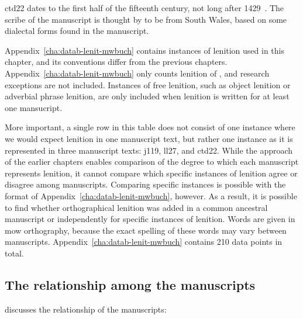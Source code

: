 \Acrfull{ctd22} dates to the first half of the fifteenth century, not long after 1429~\autocite{Eva_Welsh88}. The scribe of the manuscript is thought by \textcite[107]{Pow_description81} to be from South Wales, based on some dialectal forms found in the manuscript.

Appendix~\ref{cha:datab-lenit-mwbuch} contains instances of lenition used in this chapter, and its conventions differ from the previous chapters. Appendix~\ref{cha:datab-lenit-mwbuch} only counts lenition of , and research exceptions are not included. Instances of free lenition, such as object lenition or adverbial phrase lenition, are only included when lenition is written for at least one mansucript.

More important, a single row in this table does not consist of one instance where we would expect lenition in one manuscript text, but rather one instance as it is represented in three manuscript texts: \gls{j119}, \gls{ll27}, and \gls{ctd22}. While the approach of the earlier chapters enables  comparison of  the degree to which each manuscript represents lenition, it cannot compare which specific instances of lenition agree or disagree among manuscripts. Comparing specific instances is possible with the format of Appendix~\ref{cha:datab-lenit-mwbuch}, however.
As a result, it is possible to find  whether orthographical lenition was added in a common ancestral manuscript or independently for  specific instances of lenition. Words are given in \gls{mow} orthography, because the exact spelling of these words may vary between manuscripts.  Appendix~\ref{cha:datab-lenit-mwbuch} contains 210 data points in total.


\subsection{The relationship among the manuscripts}
\label{sec:relat-betw-manuscr}
\textcite{Eva_Welsh88} discusses the relationship of the manuscripts:


